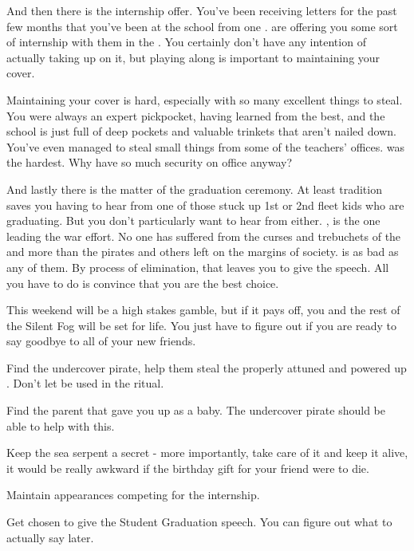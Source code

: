 \documentclass[char]{GL2020}
\begin{document}
And then there is the internship offer. You’ve been receiving letters for the past few months that you’ve been at the school from one \cEvil{}. \cEvil{\They} are offering you some sort of internship with them in the \pFarm{}. You certainly don’t have any intention of actually taking \cEvil{\them} up on it, but playing along is important to maintaining your cover.

Maintaining your cover is hard, especially with so many excellent things to steal. You were always an expert pickpocket, having learned from the best, and the school is just full of deep pockets and valuable trinkets that aren’t nailed down. You’ve even managed to steal small things from some of the teachers’ offices. \cChupInventor{} was the hardest. Why \cChupInventor{\does} \cChupInventor{\they} have so much security on \cChupInventor{\their} office anyway?

And lastly there is the matter of the graduation ceremony. At least tradition saves you having to hear from one of those stuck up 1st or 2nd fleet kids who are graduating. But you don’t particularly want to hear from \cWarlordDaughter{} either. \cWarlordDaughter{\Their} \cLoud{\parent}, \cLoud{\full} is the one leading the war effort. No one has suffered from the curses and trebuchets of the \pFarm{} and \pTech{} more than the pirates and others left on the margins of \pShip{} society. \cWarlordDaughter{} is as bad as any of them. By process of elimination, that leaves you to give the speech. All you have to do is convince \cMusic{} that you are the best choice.

This weekend will be a high stakes gamble, but if it pays off, you and the rest of the Silent Fog will be set for life. You just have to figure out if you are ready to say goodbye to all of your new friends.


\begin{itemz}[Goals]
	\item Find the undercover pirate, help them steal the properly attuned and powered up \iNet{}. Don’t let \iNet{} be used in the ritual.
	\item Find the parent that gave you up as a baby. The undercover pirate should be able to help with this.
	\item Keep the sea serpent a secret - more importantly, take care of it and keep it alive, it would be really awkward if the birthday gift for your friend were to die.
	\item Maintain appearances competing for the internship.
	\item Get chosen to give the Student Graduation speech. You can figure out what to actually say later.
\end{itemz}
\end{document}
